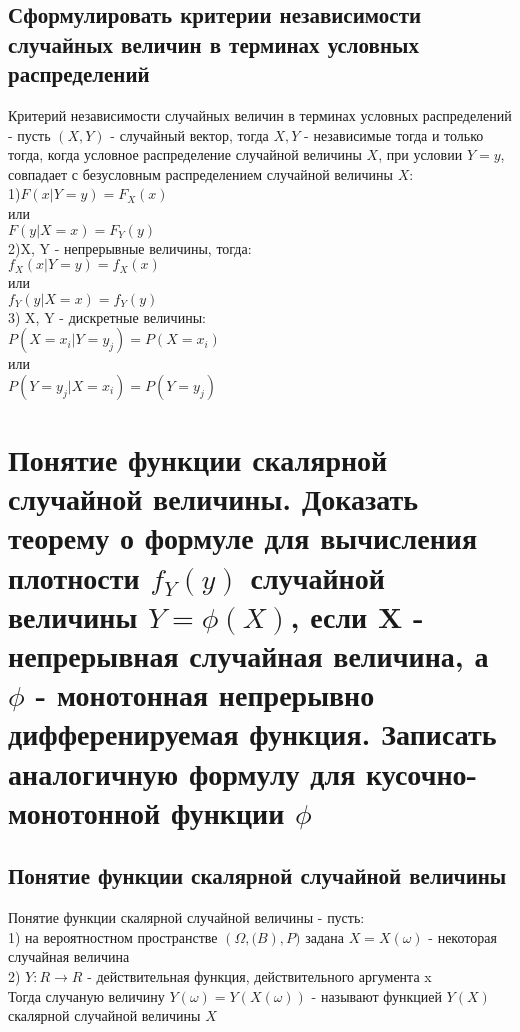 \subsection{Сформулировать критерии независимости случайных величин в терминах условных распределений}
Критерий независимости случайных величин в терминах условных распределений - пусть $(X, Y)$ - случайный вектор, тогда $X, Y$ - независимые тогда и только тогда, когда условное распределение случайной величины $X$, при условии $Y = y$, совпадает с безусловным распределением случайной величины $X$:\\
1)$F(x | Y = y) = F_{X}(x)$\\
или\\
$F(y | X = x) = F_{Y}(y)$\\
2)X, Y - непрерывные величины, тогда:\\
$f_{X}(x | Y = y) = f_{X}(x)$\\
или\\
$f_{Y}(y | X = x) = f_{Y}(y)$\\
3) X, Y - дискретные величины:\\
$P(X = x_{i} | Y = y_{j}) = P(X = x_{i})$\\
или\\
$P(Y = y_{j} | X = x_{i}) = P(Y = y_{j})$\\

\section{Понятие функции скалярной случайной величины. Доказать теорему о формуле для вычисления плотности $f_{Y}(y)$ случайной величины $Y  = \phi(X)$, если X - непрерывная случайная величина, а $\phi$ - монотонная непрерывно дифференируемая функция. Записать аналогичную формулу для кусочно-монотонной функции $\phi$}
\subsection{Понятие функции скалярной случайной величины}
Понятие функции скалярной случайной величины - пусть:\\
1) на вероятностном пространстве $(\Omega, \mathcal(B), P)$ задана $X = X(\omega)$ - некоторая случайная величина\\
2) $Y : R \rightarrow R$ - действительная функция, действительного аргумента x\\
Тогда случаную величину $Y(\omega) = Y(X(\omega)) $ - называют функцией $Y(X)$ скалярной случайной величины $X$\\

